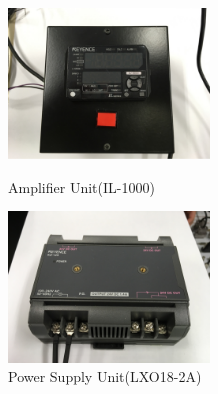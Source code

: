 \documentclass[a4paper,12pt]{article_vdlab_sotsuron}
\begin{document}
\vspace*{10mm}
\begin{figure}[htp]
  \begin{minipage}{0.5\textwidth}
    \begin{center}
      \includegraphics[height=40mm]{figure/il_1500.eps}
      \vspace*{3mm}
      \caption{Amplifier Unit(IL-1000)}
      \label{fig:il_1500}
    \end{center}
  \end{minipage}
  \begin{minipage}{0.5\textwidth}
    \begin{center}
      \includegraphics[height=40mm]{figure/lxo18_2a.eps}
      \vspace*{3mm}
      \caption{Power Supply Unit(LXO18-2A)}
      \label{fig:lxo18_2a}
    \end{center}
  \end{minipage}
\end{figure}
\end{document}

